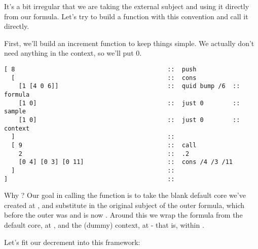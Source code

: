 It's a bit irregular that we are taking the external subject
and using it directly from our formula.  Let's try to build a
function with this convention and call it directly.

First, we'll build an increment function to keep things simple.
We actually don't need anything in the context, so we'll put 0.

\begin{framed_shaded}
\begin{Verbatim}[fontsize=\relsize{-2.5},fontseries=b,commandchars=\\\{\}]
[ 8                                          ::  push
  [                                          ::  cons
    [1 [4 0 6]]                              ::  quid bump /6  ::  formula
    [1 0]                                    ::  just 0        ::  sample
    [1 0]                                    ::  just 0        ::  context
  ]                                          ::  
  [ 9                                        ::  call
    2                                        ::  .2
    [0 4] [0 3] [0 11]                       ::  cons /4 /3 /11
  ]                                          ::  
]                                            ::
\end{Verbatim}
\end{framed_shaded}
Why \kode{[[0 4] [0 3] [0 11]]}?  Our goal in calling the function is
to take the blank default core we've created at , and
substitute in the original subject of the outer formula, which
before the outer  was  and is now .  Around this
we wrap the formula from the default core, at , and the
(dummy) context, at  - that is,  within .

Let's fit our decrement into this framework:

